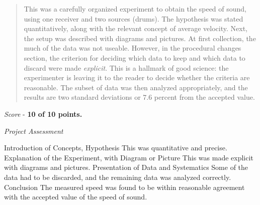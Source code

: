 \documentclass[10pt]{article}
\begin{document}
\maketitle

\begin{abstract}
This was a carefully organized experiment to obtain the speed of sound, using one receiver and two sources (drums).  The hypothesis was stated quantitatively, along with the relevant concept of average velocity.  Next, the setup was described with diagrams and pictures.  At first collection, the much of the data was not useable.  However, in the procedural changes section, the criterion for deciding which data to keep and which data to discard were made \textit{explicit}.  This is a hallmark of good science: the experimenter is leaving it to the reader to decide whether the criteria are reasonable.  The subset of data was then analyzed appropriately, and the results are two standard deviations or 7.6 percent from the accepted value.
\end{abstract}

\textit{Score} - \textbf{10 of 10 points.}

\textit{Project Assessment}
\begin{outline}[enumerate]
\1 Introduction of Concepts, Hypothesis
\2 This was quantitative and precise.
\1 Explanation of the Experiment, with Diagram or Picture
\2 This was made explicit with diagrams and pictures.
\1 Presentation of Data and Systematics
\2 Some of the data had to be discarded, and the remaining data was analyzed correctly.
\1 Conclusion
\2 The measured speed was found to be within reasonable agreement with the accepted value of the speed of sound.
\end{outline}
\end{document}
